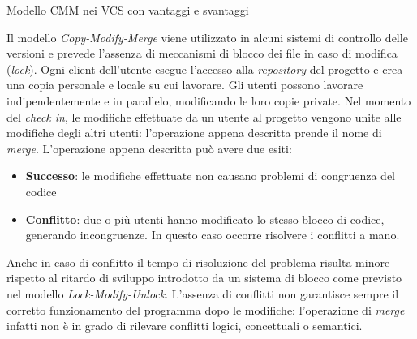 \begin{problem}{1.25}
Modello CMM nei VCS con vantaggi e svantaggi
\end{problem}
\begin{solution}
Il modello \textit{Copy-Modify-Merge} viene utilizzato in alcuni sistemi di controllo delle versioni e prevede l'assenza di meccanismi di blocco dei file in caso di modifica (\textit{lock}).
Ogni client dell'utente esegue l'accesso alla \textit{repository} del progetto e crea una copia personale e locale su cui lavorare. Gli utenti possono lavorare indipendentemente e in parallelo, modificando le loro copie private.
Nel momento del \textit{check in}, le modifiche effettuate da un utente al progetto vengono unite alle modifiche degli altri utenti: l'operazione appena descritta prende il nome di \textit{merge}.
L'operazione appena descritta può avere due esiti:
\begin{itemize}
	\item \textbf{Successo}: le modifiche effettuate non causano problemi di congruenza del codice
	\item \textbf{Conflitto}: due o più utenti hanno modificato lo stesso blocco di codice, generando incongruenze.
	\newline
	In questo caso occorre risolvere i conflitti a mano.
\end{itemize}
Anche in caso di conflitto il tempo di risoluzione del problema risulta minore rispetto al ritardo di sviluppo introdotto da un sistema di blocco come previsto nel modello \textit{Lock-Modify-Unlock}.
L'assenza di conflitti non garantisce sempre il corretto funzionamento del programma dopo le modifiche: l'operazione di \textit{merge} infatti non è in grado di rilevare conflitti logici, concettuali o semantici.
\end{solution}
